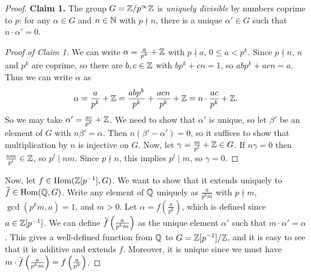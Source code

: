 \begin{proof}
    \textbf{Claim 1.} The group $G=\mathbb{Z}\slash p^\infty \mathbb{Z}$ is \emph{uniquely divisible} by numbers coprime to $p$: for any $\alpha\in G$ and $n\in\mathbb{N}$ with $p\nmid n$, there is a unique $\alpha'\in G$ such that $n\cdot \alpha'=0$.
    \begin{proof}[Proof of Claim 1]
        We can write $\alpha=\frac{a}{p^k}+\mathbb{Z}$ with $p\nmid a$, $0\leq a<p^k$. Since $p\nmid n$, $n$ and $p^k$ are coprime, so there are $b,c\in\mathbb{Z}$ with $bp^k+cn=1$, so $abp^k+acn=a$. Thus we can write $\alpha$ as
        \[\alpha=\frac{a}{p^k}+\mathbb{Z}=\frac{abp^k}{p^k}+\frac{acn}{p^k}+\mathbb{Z}=n\cdot\frac{ac}{p^k}+\mathbb{Z}.\]
        So we may take $\alpha'=\frac{ac}{p^k}+\mathbb{Z}$. We need to show that $\alpha'$ is unique, so let $\beta'$ be an element of $G$ with $n\beta'=\alpha$. Then $n(\beta'-\alpha')=0$, so it suffices to show that multiplication by $n$ is injective on $G$. Now, let $\gamma=\frac{m}{p^l}+\mathbb{Z}\in G$. If $n\gamma=0$ then $\frac{nm}{p^l}\in\mathbb{Z}$, so $p^l\mid nm$. Since $p\nmid n$, this implies $p^l\mid m$, so $\gamma =0$. 
    \end{proof}
    Now, let $f\in \operatorname{Hom}(\mathbb{Z}[p^{-1}],G)$. We want to show that it extends uniquely to $\wt{f}\in\Hom(\bbQ,G)$. Write any element of $\mathbb{Q}$ uniquely as $\frac{a}{p^k m}$ with $p\nmid m$, $\gcd(p^km,a)=1$, and $m>0$. Let $\alpha=f\left(\frac{a}{p^k}\right)$, which is defined since $a\in \mathbb{Z}[p^{-1}]$. We can define $\wt{f}\left(\frac{a}{p^km}\right)$ as the unique element $\alpha'$ such that $m\cdot \alpha'=\alpha$. This gives a well-defined function from $\mathbb{Q}$ to $G=\mathbb{Z}[p^{-1}]\slash\mathbb{Z}$, and it is easy to see that it is additive and extends $f$. Moreover, it is unique since we must have $m\cdot\wt{f}\left(\frac{a}{p^km}\right)=f\left(\frac{a}{p^k}\right)$.


\end{proof}
